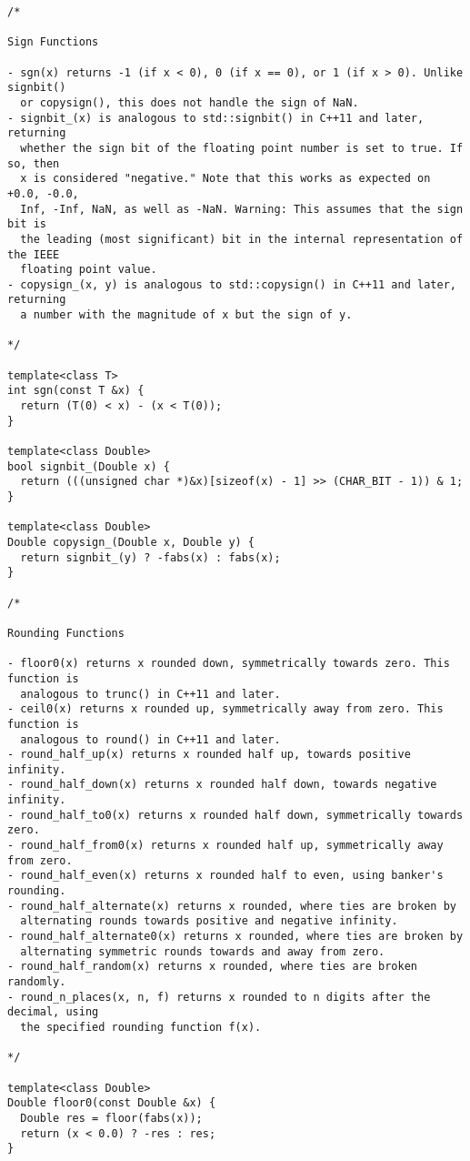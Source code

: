 \begin{lstlisting}
/*

Sign Functions

- sgn(x) returns -1 (if x < 0), 0 (if x == 0), or 1 (if x > 0). Unlike signbit()
  or copysign(), this does not handle the sign of NaN.
- signbit_(x) is analogous to std::signbit() in C++11 and later, returning
  whether the sign bit of the floating point number is set to true. If so, then
  x is considered "negative." Note that this works as expected on +0.0, -0.0,
  Inf, -Inf, NaN, as well as -NaN. Warning: This assumes that the sign bit is
  the leading (most significant) bit in the internal representation of the IEEE
  floating point value.
- copysign_(x, y) is analogous to std::copysign() in C++11 and later, returning
  a number with the magnitude of x but the sign of y.

*/

template<class T>
int sgn(const T &x) {
  return (T(0) < x) - (x < T(0));
}

template<class Double>
bool signbit_(Double x) {
  return (((unsigned char *)&x)[sizeof(x) - 1] >> (CHAR_BIT - 1)) & 1;
}

template<class Double>
Double copysign_(Double x, Double y) {
  return signbit_(y) ? -fabs(x) : fabs(x);
}

/*

Rounding Functions

- floor0(x) returns x rounded down, symmetrically towards zero. This function is
  analogous to trunc() in C++11 and later.
- ceil0(x) returns x rounded up, symmetrically away from zero. This function is
  analogous to round() in C++11 and later.
- round_half_up(x) returns x rounded half up, towards positive infinity.
- round_half_down(x) returns x rounded half down, towards negative infinity.
- round_half_to0(x) returns x rounded half down, symmetrically towards zero.
- round_half_from0(x) returns x rounded half up, symmetrically away from zero.
- round_half_even(x) returns x rounded half to even, using banker's rounding.
- round_half_alternate(x) returns x rounded, where ties are broken by
  alternating rounds towards positive and negative infinity.
- round_half_alternate0(x) returns x rounded, where ties are broken by
  alternating symmetric rounds towards and away from zero.
- round_half_random(x) returns x rounded, where ties are broken randomly.
- round_n_places(x, n, f) returns x rounded to n digits after the decimal, using
  the specified rounding function f(x).

*/

template<class Double>
Double floor0(const Double &x) {
  Double res = floor(fabs(x));
  return (x < 0.0) ? -res : res;
}


\end{lstlisting}
